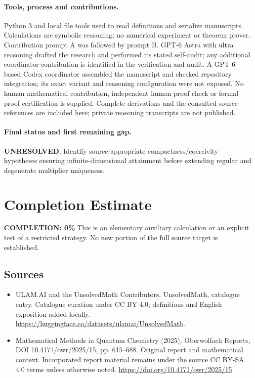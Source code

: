 \documentclass[11pt]{article}
\begin{document}
\paragraph{Tools, process and contributions.}
Python 3 and local file tools used to read definitions and serialize manuscripts. Calculations are symbolic reasoning; no numerical experiment or theorem prover. Contribution prompt A was followed by prompt B. GPT-6 Astra with ultra reasoning drafted the research and performed its stated self-audit; any additional coordinator contribution is identified in the verification and audit. A GPT-6-based Codex coordinator assembled the manuscript and checked repository integration; its exact variant and reasoning configuration were not exposed. No human mathematical contribution, independent human proof check or formal proof certification is supplied. Complete derivations and the consulted source references are included here; private reasoning transcripts are not published.

\paragraph{Final status and first remaining gap.}
\textbf{UNRESOLVED}. Identify source-appropriate compactness/coercivity hypotheses ensuring infinite-dimensional attainment before extending regular and degenerate multiplier uniqueness.

\section{Completion Estimate}
\noindent\textbf{COMPLETION: 0\%}
This is an elementary auxiliary calculation or an explicit test of a restricted strategy. No new portion of the full source target is established.

\subsection{Sources}
\begin{itemize}
\item[\hypertarget{source:statement:1}{S1}] ULAM.AI and the UnsolvedMath Contributors, UnsolvedMath, catalogue entry. Catalogue curation under CC BY 4.0; definitions and English exposition added locally.
\url{https://huggingface.co/datasets/ulamai/UnsolvedMath}.
\item[\hypertarget{source:statement:2}{S2}] Mathematical Methods in Quantum Chemistry (2025), Oberwolfach Reports, DOI 10.4171/owr/2025/15, pp. 615--688. Original report and mathematical context. Incorporated report material remains under the source CC BY-SA 4.0 terms unless otherwise noted.
\url{https://doi.org/10.4171/owr/2025/15}.
\end{itemize}
\label{end:statement}
\end{document}
